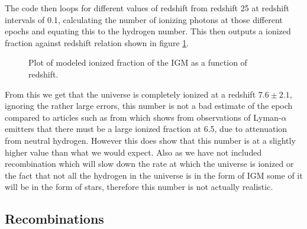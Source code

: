 	The code then loops for different values of redshift from redshift 25 at redshift intervals of 0.1, calculating the number of ionizing photons at those different epochs and equating this to the hydrogen number. This then outputs a ionized fraction against redshift relation shown in figure \ref{fig:IonizedFraction1}.
	\begin{figure}[!htb]
		\centering
			\begingroup{}
		  		\resizebox{0.7\textwidth}{!}{%
					
		  		}\endgroup
		\caption{Plot of modeled ionized fraction of the IGM as a function of redshift.\label{fig:IonizedFraction1}}
	\end{figure}

	From this we get that the universe is completely ionized at a redshift $7.6\pm2.1$, ignoring the rather large errors, this number is not a bad estimate of the epoch compared to articles such as from \cite{Ota:arXiv0707.1561} which shows from observations of Lyman-$\alpha$ emitters that there must be a large ionized fraction at 6.5, due to attenuation from neutral hydrogen. However this does show that this number is at a slightly higher value than what we would expect. Also as we have not included recombination which will slow down the rate at which the universe is ionized or the fact that not all the hydrogen in the universe is in the form of IGM some of it will be in the form of stars, therefore this number is not actually realistic.

\subsection{Recombinations} %
\label{sub:recombinations}

